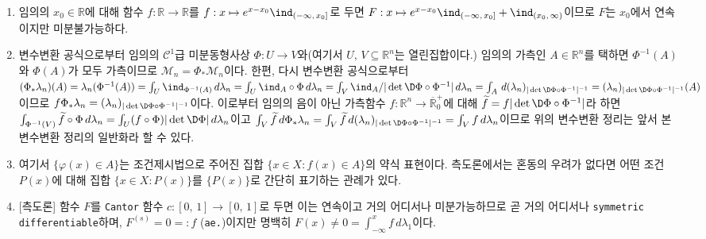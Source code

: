 \begin{enumerate}[label = \textsf{\textbf{\arabic*}}]
    \item 임의의 $x_0\in\mathbb{R}$에 대해 함수 $f:\mathbb{R}\to\mathbb{R}$를 $f:x\mapsto e^{x-x_0}\ind_{(-\infty,\,x_0]}$로 두면 $F:x\mapsto e^{x-x_0}\ind_{(-\infty,\,x_0]}+\ind_{(x_0,\,\infty)}$이므로 $F$는 $x_0$에서 연속이지만 미분불가능하다.
    \item 변수변환 공식으로부터 임의의 $\mathcal{C}^1$급 미분동형사상 $\Phi:U\to V$와(여기서 $U,\,V\subseteq\mathbb{R}^n$는 열린집합이다.) 임의의 가측인 $A\in\mathbb{R}^n$를 택하면 $\Phi^{-1}(A)$와 $\Phi(A)$가 모두 가측이므로 $\mathcal{M}_n=\Phi_*\mathcal{M}_n$이다. 한편, 다시 변수변환 공식으로부터 $(\Phi_*\lambda_n)(A)=\lambda_n(\Phi^{-1}(A))=\int_U\ind_{\Phi^{-1}(A)}\,d\lambda_n=\int_U\ind_A\circ\Phi\,d\lambda_n=\int_V\ind_A/|\det\D\Phi\circ\Phi^{-1}|\,d\lambda_n=\int_A\,d(\lambda_n)_{|\det\D\Phi\circ\Phi^{-1}|^{-1}}=(\lambda_n)_{|\det\D\Phi\circ\Phi^{-1}|^{-1}}(A)$이므로 $f\Phi_*\lambda_n=(\lambda_n)_{|\det\D\Phi\circ\Phi^{-1}|^{-1}}$이다. 이로부터 임의의 음이 아닌 가측함수 $f:\mathbb{R}^n\to\overline{\mathbb{R}}^+_0$에 대해 $\widetilde{f}=f|\det\D\Phi\circ\Phi^{-1}|$라 하면 $\int_{\Phi^{-1}(V)}\widetilde{f}\circ\Phi\,d\lambda_n=\int_U(f\circ\Phi)|\det\D\Phi|\,d\lambda_n$이고 $\int_V\widetilde{f}\,d\Phi_*\lambda_n=\int_V\widetilde{f}\,d(\lambda_n)_{|\det\D\Phi\circ\Phi^{-1}|^{-1}}=\int_Vf\,d\lambda_n$이므로 위의 변수변환 정리는 앞서 본 변수변환 정리의 일반화라 할 수 있다.
    \item 여기서 $\{\varphi(x)\in A\}$는 조건제시법으로 주어진 집합 $\{x\in X:f(x)\in A\}$의 약식 표현이다. 측도론에서는 혼동의 우려가 없다면 어떤 조건 $P(x)$에 대해 집합 $\{x\in X:P(x)\}$를 $\{P(x)\}$로 간단히 표기하는 관례가 있다.
    \item \textsf{[측도론]} 함수 $F$를 \texttt{Cantor} 함수 $c:[0,\,1]\to[0,\,1]$로 두면 이는 연속이고 거의 어디서나 미분가능하므로 곧 거의 어디서나 \texttt{symmetric differentiable}하며, $F^{(s)}=0=:f$ (\texttt{ae.})이지만 명백히 $F(x)\ne0=\int_{-\infty}^xf\,d\lambda_1$이다.

\end{enumerate}
